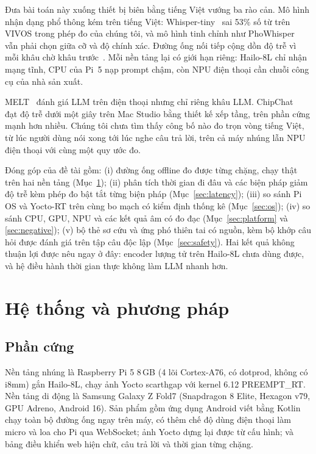 \documentclass[a4paper,12pt,twocolumn]{article}
\begin{document}
Đưa bài toán này xuống thiết bị biên bằng tiếng Việt vướng ba rào cản. Mô hình nhận dạng phổ thông kém trên tiếng Việt: Whisper-tiny~\cite{whisper} sai 53\% số từ trên VIVOS trong phép đo của chúng tôi, và mô hình tinh chỉnh như PhoWhisper~\cite{phowhisper} vẫn phải chọn giữa cỡ và độ chính xác. Đường ống nối tiếp cộng dồn độ trễ vì mỗi khâu chờ khâu trước~\cite{chipchat}. Mỗi nền tảng lại có giới hạn riêng: Hailo-8L chỉ nhận mạng tĩnh, CPU của Pi~5 nạp prompt chậm, còn NPU điện thoại cần chuỗi công cụ của nhà sản xuất.

MELT~\cite{melt} đánh giá LLM trên điện thoại nhưng chỉ riêng khâu LLM. ChipChat~\cite{chipchat} đạt độ trễ dưới một giây trên Mac Studio bằng thiết kế xếp tầng, trên phần cứng mạnh hơn nhiều. Chúng tôi chưa tìm thấy công bố nào đo trọn vòng tiếng Việt, từ lúc người dùng nói xong tới lúc nghe câu trả lời, trên cả máy nhúng lẫn NPU điện thoại với cùng một quy ước đo.

Đóng góp của đề tài gồm: (i) đường ống offline đo được từng chặng, chạy thật trên hai nền tảng (Mục~\ref{sec:system}); (ii) phân tích thời gian đi đâu và các biện pháp giảm độ trễ kèm phép đo bật tắt từng biện pháp (Mục~\ref{sec:latency}); (iii) so sánh Pi OS và Yocto-RT trên cùng bo mạch có kiểm định thống kê (Mục~\ref{sec:os}); (iv) so sánh CPU, GPU, NPU và các kết quả âm có đo đạc (Mục~\ref{sec:platform} và \ref{sec:negative}); (v) bộ thẻ sơ cứu và ứng phó thiên tai có nguồn, kèm bộ khớp câu hỏi được đánh giá trên tập câu độc lập (Mục~\ref{sec:safety}). Hai kết quả không thuận lợi được nêu ngay ở đây: encoder lượng tử trên Hailo-8L chưa dùng được, và hệ điều hành thời gian thực không làm LLM nhanh hơn.

\section{Hệ thống và phương pháp}\label{sec:system}
\subsection{Phần cứng}
Nền tảng nhúng là Raspberry Pi 5 8\,GB (4 lõi Cortex-A76, có dotprod, không có i8mm) gắn Hailo-8L, chạy ảnh Yocto scarthgap với kernel 6.12 PREEMPT\_RT. Nền tảng di động là Samsung Galaxy Z Fold7 (Snapdragon 8 Elite, Hexagon v79, GPU Adreno, Android 16). Sản phẩm gồm ứng dụng Android viết bằng Kotlin chạy toàn bộ đường ống ngay trên máy, có thêm chế độ dùng điện thoại làm micro và loa cho Pi qua WebSocket; ảnh Yocto dựng lại được từ cấu hình; và bảng điều khiển web hiện chữ, câu trả lời và thời gian từng chặng.
\end{document}
